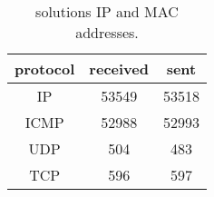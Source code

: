 \begin{table}[h!t]
	\centering
	\begin{tabular}{| c | c | c |}	
		\hline
		\textbf{protocol} & \textbf{received} & \textbf{sent} \\ \hline
		IP & 53549 & 53518 \\
		ICMP & 52988 & 52993 \\
		UDP & 504 & 483 \\
		TCP & 596 & 597 \\ \hline
	\end{tabular}
	\caption{ solutions IP and MAC addresses.}
	\label{tab:lab2-ip-to-mac-sol}
\end{table}
